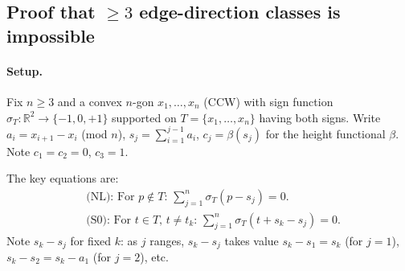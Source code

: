 %
%
%
%

\subsection*{Proof that $\geq 3$ edge-direction classes is impossible}

\paragraph{Setup.}
Fix $n \geq 3$ and a convex $n$-gon $x_1,\ldots,x_n$ (CCW) with sign function
$\sigma_T : \mathbb{R}^2 \to \{-1,0,+1\}$ supported on $T = \{x_1,\ldots,x_n\}$ having
both signs.  Write $a_i = x_{i+1}-x_i$ (mod $n$), $s_j = \sum_{i=1}^{j-1} a_i$,
$c_j = \beta(s_j)$ for the height functional $\beta$.  Note $c_1=c_2=0$, $c_3=1$.

The key equations are:
\begin{align}
  &\text{(NL): For $p \notin T$: } \textstyle\sum_{j=1}^n \sigma_T(p - s_j) = 0.\label{eq:NL}\\
  &\text{(S0): For $t \in T$, $t \neq t_k$: } \textstyle\sum_{j=1}^n \sigma_T(t + s_k - s_j) = 0.\label{eq:S0}
\end{align}
Note $s_k - s_j$ for fixed $k$: as $j$ ranges, $s_k-s_j$ takes value $s_k-s_1=s_k$
(for $j=1$), $s_k-s_2=s_k-a_1$ (for $j=2$), etc.

